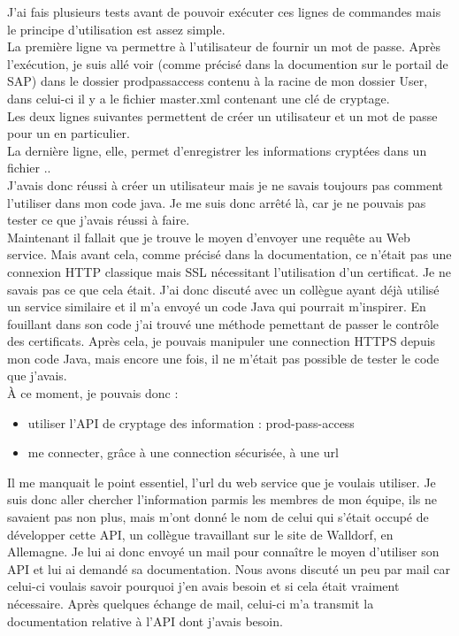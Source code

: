 J'ai fais plusieurs tests avant de pouvoir exécuter ces lignes de commandes mais le principe d'utilisation est assez simple.\\
La première ligne va permettre à l'utilisateur de fournir un mot de passe. Après l'exécution, je suis allé voir (comme précisé dans la documention sur le portail de SAP) dans le dossier prodpassaccess contenu à la racine de mon dossier User, dans celui-ci il y a le fichier master.xml contenant une clé de cryptage.\\
Les deux lignes suivantes permettent de créer un utilisateur et un mot de passe pour un  en particulier.\\
La dernière ligne, elle, permet d'enregistrer les informations cryptées dans un fichier ..\\
J'avais donc réussi à créer un utilisateur mais je ne savais toujours pas comment l'utiliser dans mon code java. Je me suis donc arrêté là, car je ne pouvais pas tester ce que j'avais réussi à faire.\\
Maintenant il fallait que je trouve le moyen d'envoyer une requête au \gls{Web service}. Mais avant cela, comme précisé dans la documentation, ce n'était pas une connexion HTTP classique mais SSL nécessitant l'utilisation d'un certificat. Je ne savais pas ce que cela était. J'ai donc discuté avec un collègue ayant déjà utilisé un service similaire et il m'a envoyé un code \gls{Java} qui pourrait m'inspirer. En fouillant dans son code j'ai trouvé une méthode pemettant de passer le contrôle des certificats. Après cela, je pouvais manipuler une connection HTTPS depuis mon code \gls{Java}, mais encore une fois, il ne m'était pas possible de tester le code que j'avais.\\
\`{A} ce moment, je pouvais donc :
\begin{itemize}
	\item utiliser l'API de cryptage des information : prod-pass-access
	\item me connecter, grâce à une connection sécurisée, à une url
\end{itemize}
Il me manquait le point essentiel, l'url du web service que je voulais utiliser. Je suis donc aller chercher l'information parmis les membres de mon équipe, ils ne savaient pas non plus, mais m'ont donné le nom de celui qui s'était occupé de développer cette API, un collègue travaillant sur le site de Walldorf, en Allemagne. Je lui ai donc envoyé un mail pour conna\^{i}tre le moyen d'utiliser son API et lui ai demandé sa documentation. Nous avons discuté un peu par mail car celui-ci voulais savoir pourquoi j'en avais besoin et si cela était vraiment nécessaire. Après quelques échange de mail, celui-ci m'a transmit la documentation relative à l'API dont j'avais besoin.\\

